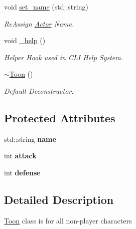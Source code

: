 \begin{DoxyCompactItemize}
void \mbox{\hyperlink{classToon_a3153521dfdd2ddb84806629b78f75082}{set\+\_\+name}} (std\+::string)
\begin{DoxyCompactList}\small\item\em Re\+Assign \mbox{\hyperlink{classActor}{Actor}} Name. \end{DoxyCompactList}\item 
\mbox{\label{classToon_a933c06ba4e92b679639df462db1e731e}} 
void \mbox{\hyperlink{classToon_a933c06ba4e92b679639df462db1e731e}{\+\_\+help}} ()
\begin{DoxyCompactList}\small\item\em Helper Hook used in C\+LI Help System. \end{DoxyCompactList}\item 
\mbox{\label{classToon_ac186ca4ad335951b350d7aaa4edae095}} 
\mbox{\hyperlink{classToon_ac186ca4ad335951b350d7aaa4edae095}{$\sim$\+Toon}} ()
\begin{DoxyCompactList}\small\item\em Default Deconstructor. \end{DoxyCompactList}\end{DoxyCompactItemize}
\subsection*{Protected Attributes}
\begin{DoxyCompactItemize}
\item 
\mbox{\label{classToon_a5ea55dfc6138b6c5bd8d128b0169f00b}} 
std\+::string {\bfseries name}
\item 
\mbox{\label{classToon_ae71fdcfc1905bd89f148c3e4a050250d}} 
int {\bfseries attack}
\item 
\mbox{\label{classToon_a6c9ca41428cee341c0feac49afa910a0}} 
int {\bfseries defense}
\end{DoxyCompactItemize}


\subsection{Detailed Description}
\mbox{\hyperlink{classToon}{Toon}} class is for all non-\/player characters ~\newline
 

